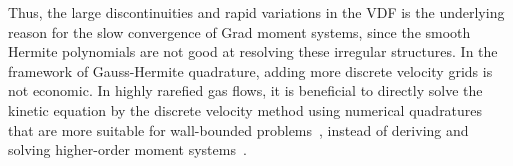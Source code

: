Thus, the large discontinuities and rapid variations in the VDF is the underlying reason for the slow convergence of Grad moment systems, since the smooth Hermite polynomials are not good at resolving these irregular structures. In the framework of Gauss-Hermite quadrature, adding more discrete velocity grids is not economic. In highly rarefied gas flows, it is beneficial to directly solve the kinetic equation by the discrete velocity method using numerical quadratures that are more suitable for wall-bounded problems~\cite{Su2007PRE,Naris_pof,Ambrus2012PRE}, instead of deriving and solving higher-order moment systems~\cite{Cai2010Siam}. 





















